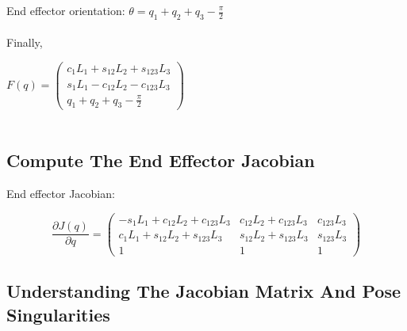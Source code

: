 \documentclass[a4paper,10pt]{article}
\begin{document}
End effector orientation:
$
\theta = q_1+q_2+q_3- \frac{\pi}{2}
$
\\~~\\
Finally, 

$
F(q)=
\begin{pmatrix}
c_1L_1+s_{12}L_2+s_{123}L_3 \\
s_1L_1 - c_{12}L_2 - c_{123}L_3\\
q_1+q_2+q_3- \frac{\pi}{2}
\end{pmatrix}
$
\\~\\
\subsection{Compute The End Effector Jacobian}

End effector Jacobian:

$$
\dfrac{\partial J(q)}{\partial q} = 
\begin{pmatrix}
-s_1L_1+c_{12}L_2+c_{123}L_3 & c_{12}L_2+c_{123}L_3 & c_{123}L_3 \\
c_1L_1 + s_{12}L_2 + s_{123}L_3 & s_{12}L_2 + s_{123}L_3 & s_{123}L_3\\
1 & 1 & 1
\end{pmatrix} 
$$

\subsection{Understanding The Jacobian Matrix And Pose Singularities}
\end{document}
